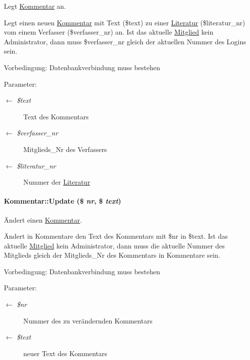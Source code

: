 Legt \hyperlink{classKommentar}{Kommentar} an. 

Legt einen neuen \hyperlink{classKommentar}{Kommentar} mit Text (\$text) zu einer \hyperlink{classLiteratur}{Literatur} (\$literatur\_\-nr) vom einem Verfasser (\$verfasser\_\-nr) an. Ist das aktuelle \hyperlink{classMitglied}{Mitglied} kein Administrator, dann muss \$verfasser\_\-nr gleich der aktuellen Nummer des Logins sein. \begin{Desc}
\item[Vorbedingung:]Datenbankverbindung muss bestehen \end{Desc}
\begin{Desc}
\item[Parameter:]
\begin{description}
\item[\mbox{$\leftarrow$} {\em \$text}]Text des Kommentars \item[\mbox{$\leftarrow$} {\em \$verfasser\_\-nr}]Mitglieds\_\-Nr des Verfassers \item[\mbox{$\leftarrow$} {\em \$literatur\_\-nr}]Nummer der \hyperlink{classLiteratur}{Literatur} \end{description}
\end{Desc}
\hypertarget{classKommentar_0b3e20e910493e67b67b747243f04511}{
\paragraph[Update]{\setlength{\rightskip}{0pt plus 5cm}Kommentar::Update (\$ {\em nr}, \$ {\em text})}\hfill}
\label{classKommentar_0b3e20e910493e67b67b747243f04511}


Ändert einen \hyperlink{classKommentar}{Kommentar}. 

Ändert in Kommentare den Text des Kommentars mit \$nr in \$text. Ist das aktuelle \hyperlink{classMitglied}{Mitglied} kein Administrator, dann muss die aktuelle Nummer des Mitglieds gleich der Mitglieds\_\-Nr des Kommentars in Kommentare sein. \begin{Desc}
\item[Vorbedingung:]Datenbankverbindung muss bestehen \end{Desc}
\begin{Desc}
\item[Parameter:]
\begin{description}
\item[\mbox{$\leftarrow$} {\em \$nr}]Nummer des zu verändernden Kommentars \item[\mbox{$\leftarrow$} {\em \$text}]neuer Text des Kommentars \end{description}
\end{Desc}


